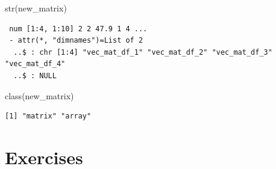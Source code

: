 \documentclass[
  letterpaper,
  DIV=11,
  numbers=noendperiod]{scrreprt}
\newenvironment{Shaded}{\begin{snugshade}}{\end{snugshade}}
\newcommand{\FunctionTok}[1]{\textcolor[rgb]{0.28,0.35,0.67}{#1}}
\newcommand{\NormalTok}[1]{\textcolor[rgb]{0.00,0.23,0.31}{#1}}
\begin{document}
\begin{Shaded}
\begin{Highlighting}[]
\FunctionTok{str}\NormalTok{(new\_matrix)}
\end{Highlighting}
\end{Shaded}

\begin{verbatim}
 num [1:4, 1:10] 2 2 47.9 1 4 ...
 - attr(*, "dimnames")=List of 2
  ..$ : chr [1:4] "vec_mat_df_1" "vec_mat_df_2" "vec_mat_df_3" "vec_mat_df_4"
  ..$ : NULL
\end{verbatim}

\begin{Shaded}
\begin{Highlighting}[]
\FunctionTok{class}\NormalTok{(new\_matrix)}
\end{Highlighting}
\end{Shaded}

\begin{verbatim}
[1] "matrix" "array" 
\end{verbatim}

\section{Exercises}\label{exercises-8}
\end{document}
